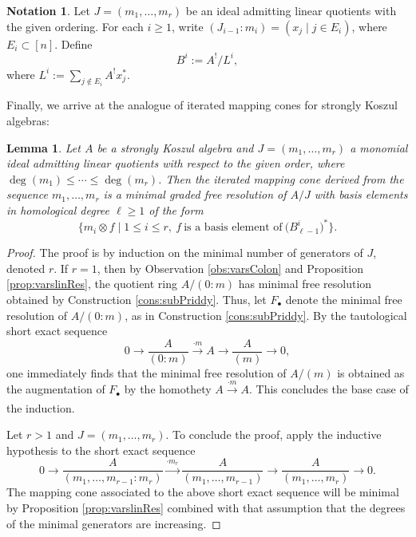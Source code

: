 \documentclass[10pt]{amsart}
\newtheorem{lemma}[theorem]{Lemma}
\theoremstyle{definition}
\newtheorem{notation}[theorem]{Notation}
\theoremstyle{remark}
\newtheorem{the context}[theorem]{The Context}
\numberwithin{equation}{theorem}
\numberwithin{equation}{section}
\renewcommand{\geq}{\geqslant}
\renewcommand{\leq}{\leqslant}
\begin{document}
\begin{notation}\label{not:Lideals}
Let $J = (m_1 , \dots , m_r)$ be an ideal admitting linear quotients with the given ordering. For each $i \geq 1$, write $(J_{i-1} : m_i) = (x_j \mid j \in E_i)$, where $E_i \subset [n]$. Define 
$$B^i := A^! / L^i,$$
where $L^i := \sum_{j \notin E_i} A^! x_j^*$.
\end{notation}

Finally, we arrive at the analogue of iterated mapping cones for strongly Koszul algebras:

\begin{lemma}\label{lem:IMCbasis}
Let $A$ be a strongly Koszul algebra and $J = (m_1 , \dots , m_r)$ a monomial ideal admitting linear quotients with respect to the given order, where $\deg (m_1) \leq \cdots \leq \deg(m_r)$. Then the iterated mapping cone derived from the sequence $m_1 , \dots , m_r$ is a minimal graded free resolution of $A/J$ with basis elements in homological degree $\ell \geq 1$ of the form
$$\{ m_i \otimes f \mid 1 \leq i \leq r, \ f \ \textrm{is a basis element of} \ \big( B^i_{\ell-1} \big)^* \}.$$
\end{lemma}

\begin{proof}
The proof is by induction on the minimal number of generators of $J$, denoted $r$. If $r = 1$, then by Observation \ref{obs:varsColon} and Proposition \ref{prop:varslinRes}, the quotient ring $A / (0:m)$ has minimal free resolution obtained by Construction \ref{cons:subPriddy}. Thus, let $F_\bullet$ denote the minimal free resolution of $A/(0:m)$, as in Construction \ref{cons:subPriddy}. By the tautological short exact sequence
$$0 \to \frac{A}{(0:m)} \xrightarrow[]{\cdot m} A \to \frac{A}{(m)} \to 0,$$
one immediately finds that the minimal free resolution of $A/(m)$ is obtained as the augmentation of $F_\bullet$ by the homothety $A \xrightarrow[]{\cdot m} A$. This concludes the base case of the induction.

Let $r>1$ and $J = (m_1 , \dots , m_r)$. To conclude the proof, apply the inductive hypothesis to the short exact sequence
$$ 0 \to \frac{A}{(m_1 , \dots , m_{r-1} : m_r )} \xrightarrow[]{\cdot m_r} \frac{A}{(m_1 , \dots , m_{r-1})} \to \frac{A}{(m_1 , \dots , m_r)} \to 0.$$
The mapping cone associated to the above short exact sequence will be minimal by Proposition \ref{prop:varslinRes} combined with that assumption that the degrees of the minimal generators are increasing.
\end{proof}
\end{document}
